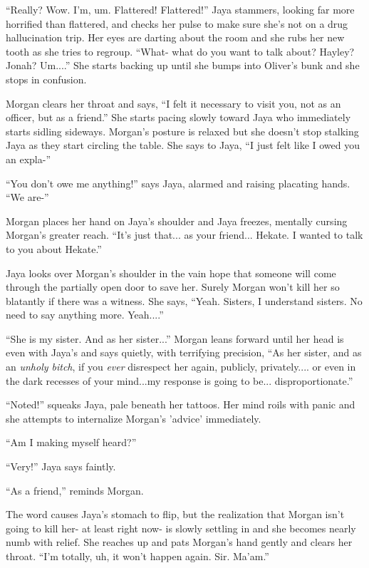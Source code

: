 ``Really?  Wow.  I'm, um.  Flattered!  Flattered!'' Jaya stammers, looking far more horrified than flattered, and checks her pulse to make sure she's not on a drug hallucination trip.  Her eyes are darting about the room and she rubs her new tooth as she tries to regroup.  ``What- what do you want to talk about?  Hayley?  Jonah?  Um....''  She starts backing up until she bumps into Oliver's bunk and she stops in confusion.

Morgan clears her throat and says, ``I felt it necessary to visit you, not as an officer, but as a friend.''  She starts pacing slowly toward Jaya who immediately starts sidling sideways.  Morgan's posture is relaxed but she doesn't stop stalking Jaya as they start circling the table.  She says to Jaya, ``I just felt like I owed you an expla-''

``You don't owe me anything!'' says Jaya, alarmed and raising placating hands. ``We are-''

Morgan places her hand on Jaya's shoulder and Jaya freezes, mentally cursing Morgan's greater reach.  ``It's just that... as your friend...  Hekate.  I wanted to talk to you about Hekate.''

Jaya looks over Morgan's shoulder in the vain hope that someone will come through the partially open door to save her.  Surely Morgan won't kill her so blatantly if there was a witness.  She says, ``Yeah. Sisters, I understand sisters.  No need to say anything more.  Yeah....''

``She is my sister.  And as her sister...'' Morgan leans forward until her head is even with Jaya's and says quietly, with terrifying precision, ``As her sister, and as an \textit{unholy bitch}, if you \textit{ever} disrespect her again, publicly, privately.... or even in the dark recesses of your mind...my response is going to be... disproportionate.''

``Noted!'' squeaks Jaya, pale beneath her tattoos.  Her mind roils with panic and she attempts to internalize Morgan's 'advice' immediately.

``Am I making myself heard?''

``Very!'' Jaya says faintly.

``As a friend,'' reminds Morgan.

The word causes Jaya's stomach to flip, but the realization that Morgan isn't going to kill her- at least right now- is slowly settling in and she becomes nearly numb with relief. She reaches up and pats Morgan's hand gently and clears her throat.  ``I'm totally, uh, it won't happen again. Sir.  Ma'am.''

